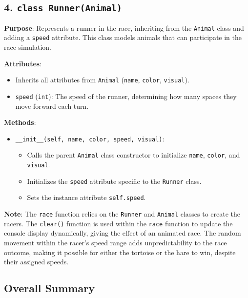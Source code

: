 \begin{homeworkProblem}
\bigskip

\subsection*{4. \texttt{class Runner(Animal)}}

\textbf{Purpose}: Represents a runner in the race, inheriting from the \texttt{Animal} class and adding a \texttt{speed} attribute. This class models animals that can participate in the race simulation.

\textbf{Attributes}:

\begin{itemize}
  \item Inherits all attributes from \texttt{Animal} (\texttt{name}, \texttt{color}, \texttt{visual}).
  \item \texttt{speed} (\texttt{int}): The speed of the runner, determining how many spaces they move forward each turn.
\end{itemize}

\textbf{Methods}:

\begin{itemize}
  \item \texttt{\_\_init\_\_(self, name, color, speed, visual)}:
    \begin{itemize}
      \item Calls the parent \texttt{Animal} class constructor to initialize \texttt{name}, \texttt{color}, and \texttt{visual}.
      \item Initializes the \texttt{speed} attribute specific to the \texttt{Runner} class.
      \item Sets the instance attribute \texttt{self.speed}.
    \end{itemize}
\end{itemize}

\bigskip

\textbf{Note}: The \texttt{race} function relies on the \texttt{Runner} and \texttt{Animal} classes to create the racers. The \texttt{clear()} function is used within the \texttt{race} function to update the console display dynamically, giving the effect of an animated race. The random movement within the racer's speed range adds unpredictability to the race outcome, making it possible for either the tortoise or the hare to win, despite their assigned speeds.

\bigskip

\subsection*{Overall Summary}


\end{homeworkProblem}

